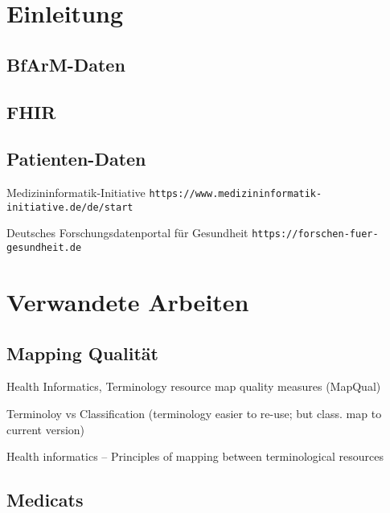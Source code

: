 \section{Einleitung}

\subsection{BfArM-Daten}

\subsection{FHIR}

\subsection{Patienten-Daten}

Medizininformatik-Initiative
\texttt{https://www.medizininformatik-initiative.de/de/start}

Deutsches Forschungsdatenportal für Gesundheit
\texttt{https://forschen-fuer-gesundheit.de}

\section{Verwandete Arbeiten}

\subsection{Mapping Qualität}

Health Informatics, Terminology resource map quality measures (MapQual) \citep{ISO21564}

Terminoloy vs Classification (terminology easier to re-use; but class. map to current version)

Health informatics -- Principles of mapping between terminological resources \citep{ISO12300}

\subsection{Medicats}

\begin{comment}
\bibitem{Medicats}
Medicats Library \newline
\url{https://github.com/hhund/medicats}

\bibitem{Medicats Thesis}
``Medical Classification and Terminology Systems in a Secondary Use Context: Challenges and Perils'' \newline
\url{https://www.researchgate.net/publication/320962066_Medical_Classification_and_Terminology_Systems_in_a_Secondary_Use_Context_Challenges_and_Perils}
\end{comment}

